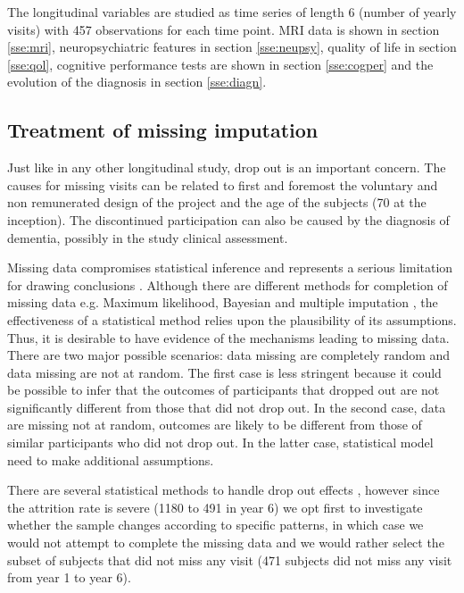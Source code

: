 \documentclass[11pt]{article}
\theoremstyle{definition}
\theoremstyle{remark}
\begin{document}
The longitudinal variables are studied as time series of length 6 (number of yearly visits) with 457 observations for each time point.  MRI data is shown in section \ref{sse:mri}, neuropsychiatric features in section \ref{sse:neupsy}, quality of life in section \ref{sse:qol}, cognitive performance tests are shown in section \ref{sse:cogper} and the evolution of the diagnosis in section \ref{sse:diagn}.

\subsection{Treatment of missing imputation}
\label{sse:miss}
Just like in any other longitudinal study, drop out is an important concern. The causes for missing visits can be related to first and foremost the voluntary and non remunerated design of the project and the age of the subjects (70 at the inception). The discontinued participation can also be caused by the diagnosis of dementia, possibly in the study clinical assessment.

Missing data compromises statistical inference and represents a serious limitation for drawing conclusions \cite{little2012prevention}. 
Although there are different methods for completion of missing data e.g. Maximum likelihood, Bayesian and multiple imputation \cite{hogan2004handling}, the effectiveness of a statistical method relies upon the plausibility of its assumptions. Thus, it is desirable to have evidence of the mechanisms leading to missing data. There are two major possible scenarios: data missing are completely random and data missing are not at random. The first case is less stringent because it could be possible to infer that the outcomes of participants that dropped out are not significantly different from those that did not drop out. In the second case, data are missing not at random, outcomes are likely to be different from those of similar participants who did not drop out. In the latter case, statistical model need to make additional assumptions. 

There are several statistical methods to handle drop out effects \cite{hogan2004handling}, however since the attrition rate is severe (1180 to 491 in year 6) we opt first to investigate whether the sample changes according to specific patterns, in which case we would not attempt to complete the missing data and we would rather select the subset of subjects that did not miss any visit (471 subjects did not miss any visit from year 1 to year 6).
\end{document}
